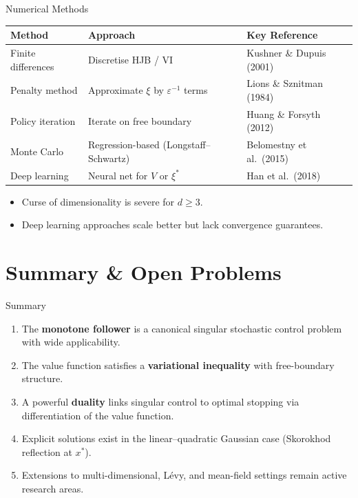 \documentclass[11pt, aspectratio=169]{beamer}
\theoremstyle{plain}
\begin{document}
\begin{frame}{Numerical Methods}
  \begin{table}[h]
    \centering
    \renewcommand{\arraystretch}{1.3}
    \begin{tabular}{@{}lll@{}}
      \toprule
      \textbf{Method} & \textbf{Approach} & \textbf{Key Reference} \\
      \midrule
      Finite differences & Discretise HJB / VI & Kushner \& Dupuis (2001) \\
      Penalty method     & Approximate $\xi$ by
                           $\varepsilon^{-1}$ terms & Lions \& Sznitman (1984) \\
      Policy iteration   & Iterate on free boundary & Huang \& Forsyth (2012) \\
      Monte Carlo        & Regression-based
                           (Longstaff--Schwartz) & Belomestny et al.\ (2015) \\
      Deep learning      & Neural net for $V$ or $\xi^*$ & Han et al.\ (2018) \\
      \bottomrule
    \end{tabular}
  \end{table}

  \begin{itemize}
    \item Curse of dimensionality is severe for $d \ge 3$.
    \item Deep learning approaches scale better but lack convergence guarantees.
  \end{itemize}
\end{frame}

\section{Summary \& Open Problems}

\begin{frame}{Summary}
  \begin{enumerate}
    \item The \textbf{monotone follower} is a canonical singular stochastic
          control problem with wide applicability.
    \item The value function satisfies a \textbf{variational inequality}
          with free-boundary structure.
    \item A powerful \textbf{duality} links singular control to optimal stopping
          via differentiation of the value function.
    \item Explicit solutions exist in the linear--quadratic Gaussian case
          (Skorokhod reflection at $x^*$).
    \item Extensions to multi-dimensional, L\'evy, and mean-field settings
          remain active research areas.
  \end{enumerate}
\end{frame}
\end{document}
